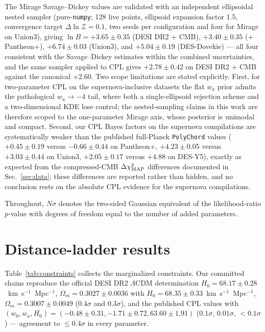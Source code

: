 \documentclass[aps,prd,preprint,superscriptaddress,nofootinbib]{revtex4-2}
\begin{document}
The Mirage Savage--Dickey values are validated with an independent ellipsoidal nested sampler (pure-\texttt{numpy}; 128 live points, ellipsoid expansion factor 1.5, convergence target $\Delta \ln \mathcal{Z} = 0.1$, two seeds per configuration and four for Mirage on Union3), giving $\ln B = +3.65 \pm 0.35$ (DESI DR2 + CMB), $+3.40 \pm 0.35$ (+ Pantheon+), $+6.74 \pm 0.03$ (Union3), and $+5.04 \pm 0.19$ (DES-Dovekie) --- all four consistent with the Savage--Dickey estimates within the combined uncertainties, and the same sampler applied to CPL gives $+2.78 \pm 0.42$ on DESI DR2 + CMB against the canonical $+2.60$. Two scope limitations are stated explicitly. First, for two-parameter CPL on the supernova-inclusive datasets the flat $w_a$ prior admits the pathological $w_a \to -4$ tail, where both a single-ellipsoid rejection scheme and a two-dimensional KDE lose control; the nested-sampling claims in this work are therefore scoped to the one-parameter Mirage axis, whose posterior is unimodal and compact. Second, our CPL Bayes factors on the supernova compilations are systematically weaker than the published full-Planck \texttt{PolyChord} values ($+0.45 \pm 0.19$ versus $-0.66 \pm 0.44$ on Pantheon+, $+4.23 \pm 0.05$ versus $+3.03 \pm 0.44$ on Union3, $+2.05 \pm 0.17$ versus $+4.88$ on DES-Y5), exactly as expected from the compressed-CMB $\Delta\chi^2_{\rm MAP}$ differences documented in Sec.~\ref{sec:data}; these differences are reported rather than hidden, and no conclusion rests on the absolute CPL evidence for the supernova compilations.

Throughout, $N\sigma$ denotes the two-sided Gaussian equivalent of the likelihood-ratio $p$-value with degrees of freedom equal to the number of added parameters.

\section{Distance-ladder results}
\label{sec:results}

Table~\ref{tab:constraints} collects the marginalized constraints. Our committed chains reproduce the official DESI DR2 $\Lambda$CDM determination $H_0 = 68.17 \pm 0.28$~km~s$^{-1}$~Mpc$^{-1}$, $\Omega_m = 0.3027 \pm 0.0036$ with $H_0 = 68.35 \pm 0.33$~km~s$^{-1}$~Mpc$^{-1}$, $\Omega_m = 0.3007 \pm 0.0049$ ($0.4\sigma$ and $0.3\sigma$), and the published CPL values with $(w_0, w_a, H_0) = (-0.48 \pm 0.31, -1.71 \pm 0.72, 63.60 \pm 1.91)$ ($0.1\sigma$, $0.01\sigma$, $<0.1\sigma$) --- agreement to $\le 0.4\sigma$ in every parameter.
\end{document}
